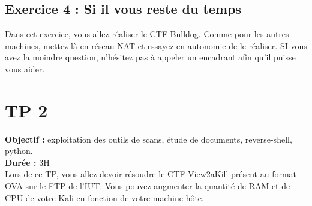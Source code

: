 \subsection{Exercice 4 : Si il vous reste du temps}

Dans cet exercice, vous allez réaliser le CTF Bulldog. Comme pour les autres machines, mettez-là en réseau NAT et essayez en autonomie de le réaliser. SI vous avez la moindre question, n’hésitez pas à appeler un encadrant afin qu’il puisse vous aider.

\newpage

\section{TP 2}

\noindent\textbf{Objectif :} exploitation des outils de scans, étude de documents, reverse-shell, python.\\
\textbf{Durée :} 3H\\

Lors de ce TP, vous allez devoir résoudre le CTF View2aKill présent au format OVA sur le FTP de l’IUT. Vous pouvez augmenter la quantité de RAM et de CPU de votre Kali en fonction de votre machine hôte.

